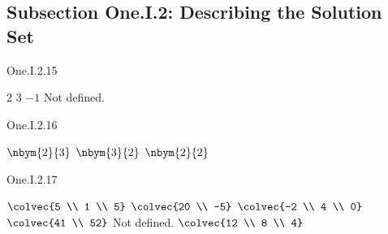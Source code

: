 \subsection{Subsection One.I.2: Describing the Solution Set}
\begin{ans}{One.I.2.15}
      \begin{exparts*}
        \partsitem \( 2 \)
        \partsitem \( 3 \)
        \partsitem \(-1 \)
        \partsitem Not defined.
      \end{exparts*}
    
\end{ans}
\begin{ans}{One.I.2.16}
      \begin{exparts*}
        \partsitem \( \nbym{2}{3} \)
        \partsitem \( \nbym{3}{2} \)
        \partsitem \( \nbym{2}{2} \)
      \end{exparts*}
    
\end{ans}
\begin{ans}{One.I.2.17}
      \begin{exparts*}
        \partsitem \( \colvec{5 \\ 1 \\ 5} \)
        \partsitem \( \colvec{20 \\ -5} \)
        \partsitem \( \colvec{-2 \\ 4 \\ 0} \)
        \partsitem \( \colvec{41 \\ 52} \)
        \partsitem Not defined.
        \partsitem \( \colvec{12 \\ 8 \\ 4} \)
      \end{exparts*}
     
\end{ans}
